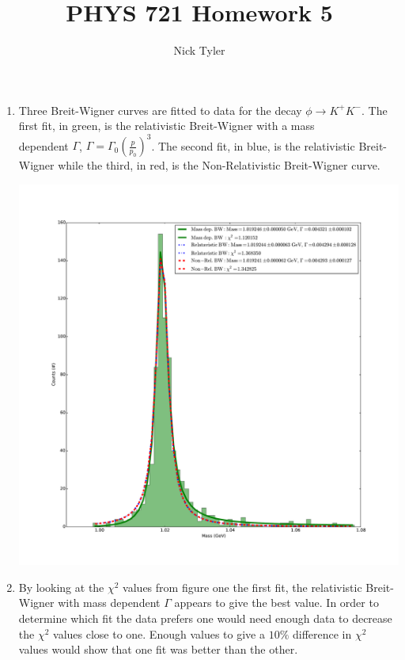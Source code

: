 \documentclass[pdftex]{article}
\title{PHYS 721 Homework 5}
\author{Nick Tyler}
\date{}
\begin{document}
\captionsetup[figure]{aboveskip=-15pt}
\captionsetup[figure]{belowskip=15pt}
\maketitle
\begin{enumerate}
	\item Three Breit-Wigner curves are fitted to data for the decay $\phi \rightarrow K^{+} K^{-}$. 
		The first fit, in green, is the relativistic Breit-Wigner with a mass \\ dependent $\Gamma$, 
		$\Gamma = \Gamma_{0} \left( \frac{p}{p_0} \right)^3$. The second fit, in blue, is the relativistic Breit-Wigner 
		while the third, in red, is the Non-Relativistic Breit-Wigner curve. \

		\includegraphics[scale=0.35]{Problem_1_and_2.pdf}\\
		
	\pagebreak

	\item By looking at the $\chi^2$ values from figure one the first fit, the relativistic Breit-Wigner
		with mass dependent $\Gamma$ appears to give the best value. In order to determine which fit the data prefers one would need enough data to decrease the $\chi^2$ values close to one.  Enough values to give a $10\%$ difference in $\chi^2$ values would show that one fit was better than the other.



\end{enumerate}
\end{document}
